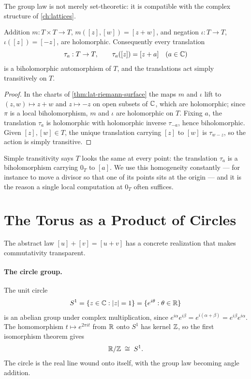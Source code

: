 The group law is not merely set-theoretic: it is compatible with the complex
structure of \cref{ch:lattices}.

\begin{proposition}
\label{prop:tg-lie}
Addition \(m : T \times T \to T\), \(m([z],[w]) = [z+w]\), and negation
\(\iota : T \to T\), \(\iota([z]) = [-z]\), are holomorphic. Consequently every
translation
\[
  \tau_a : T \to T, \qquad \tau_a([z]) = [z + a] \quad (a \in \mathbb{C})
\]
is a biholomorphic automorphism of \(T\), and the translations act simply
transitively on \(T\).
\end{proposition}

\begin{proof}
In the charts of \cref{thm:lat-riemann-surface} the maps \(m\) and \(\iota\)
lift to \((z,w) \mapsto z+w\) and \(z \mapsto -z\) on open subsets of \(\mathbb{C}\),
which are holomorphic; since \(\pi\) is a local biholomorphism, \(m\) and
\(\iota\) are holomorphic on \(T\). Fixing \(a\), the translation \(\tau_a\) is
holomorphic with holomorphic inverse \(\tau_{-a}\), hence biholomorphic. Given
\([z], [w] \in T\), the unique translation carrying \([z]\) to \([w]\) is
\(\tau_{w-z}\), so the action is simply transitive.
\end{proof}

\begin{remark}
\label{rem:tg-homogeneous}
Simple transitivity says \(T\) looks the same at every point: the translation
\(\tau_a\) is a biholomorphism carrying \(0_T\) to \([a]\). We use this
homogeneity constantly --- for instance to move a divisor so that one of its
points sits at the origin --- and it is the reason a single local computation at
\(0_T\) often suffices.
\end{remark}

\section{The Torus as a Product of Circles}
\label{sec:tg-product}

The abstract law \([u]+[v]=[u+v]\) has a concrete realization that makes
commutativity transparent.

\paragraph{The circle group.}
The unit circle
\[
  S^1 = \{ z \in \mathbb{C} : |z| = 1 \} = \{ e^{i\theta} : \theta \in \mathbb{R} \}
\]
is an abelian group under complex multiplication, since
\(e^{i\alpha} e^{i\beta} = e^{i(\alpha+\beta)} = e^{i\beta} e^{i\alpha}\). The
homomorphism \(t \mapsto e^{2\pi i t}\) from \(\mathbb{R}\) onto \(S^1\) has kernel
\(\mathbb{Z}\), so the first isomorphism theorem gives
\[
  \mathbb{R}/\mathbb{Z} \;\cong\; S^1 .
\]
The circle is the real line wound onto itself, with the group law becoming angle
addition.

